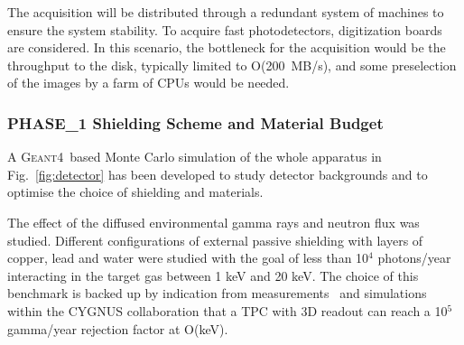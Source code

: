 \documentclass[physics,article,submit,moreauthors,pdftex]{Definitions/mdpi}
\newcommand{\GEANT} {{\textsc{Geant4}}\xspace}
\begin{document}

The acquisition will be distributed through a redundant system of 
machines to ensure the system stability. To acquire fast photodetectors, digitization boards are considered. In this scenario, the bottleneck for the acquisition would be the throughput to the disk, typically limited to O(200~MB/s),
and some preselection of the images by a farm of CPUs would be needed. 


\subsubsection{PHASE\_1 Shielding Scheme and Material Budget}\label{sec:back}

A \GEANT~based Monte Carlo simulation of the whole apparatus in Fig.~\ref{fig:detector} has been developed to study detector backgrounds and to optimise the choice of shielding and materials. 

The effect of the diffused environmental gamma rays and neutron flux was studied. Different configurations of external passive shielding with layers of copper, lead and water were studied with the goal of less than 10$^4$ photons/year interacting in the target gas between 1 keV and 20 keV. The choice of this benchmark is backed up by indication from measurements~\cite{Riffard:2016mgw,Phan:2015pda} and simulations within the CYGNUS collaboration\cite{Vahsen:2020pzb} that a TPC with 3D readout can reach a 10$^5$ gamma/year rejection factor at O(keV). 
\end{document}
